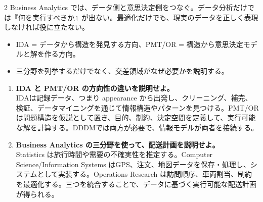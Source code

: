 \begin{multicols}{2}
Business Analytics では、データ側と意思決定側をつなぐ。データ分析だけでは『何を実行すべきか』が出ない。最適化だけでも、現実のデータを正しく表現しなければ役に立たない。\par
{}
\begin{itemize}
\item IDA = データから構造を発見する方向、PMT/OR = 構造から意思決定モデルと解を作る方向。
\item 三分野を列挙するだけでなく、交差領域がなぜ必要かを説明する。
\end{itemize}
\begin{enumerate}
\item \textbf{IDA と PMT/OR の方向性の違いを説明せよ。}\\IDAは記録データ、つまり appearance から出発し、クリーニング、補完、検証、データマイニングを通じて情報構造やパターンを見つける。PMT/ORは問題構造を仮説として置き、目的、制約、決定空間を定義して、実行可能な解を計算する。DDDMでは両方が必要で、情報モデルが両者を接続する。
\item \textbf{Business Analytics の三分野を使って、配送計画を説明せよ。}\\Statistics は旅行時間や需要の不確実性を推定する。Computer Science/Information Systems はGPS、注文、地図データを保存・処理し、システムとして実装する。Operations Research は訪問順序、車両割当、制約を最適化する。三つを統合することで、データに基づく実行可能な配送計画が得られる。
\end{enumerate}
\end{multicols}

